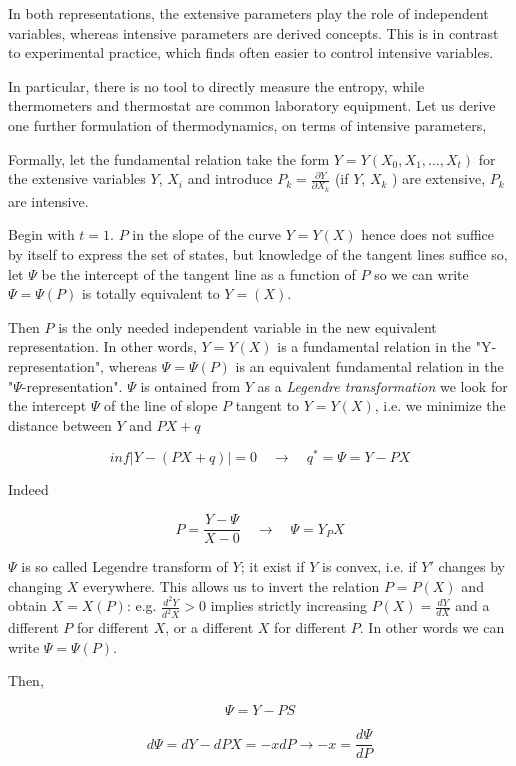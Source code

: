 \documentclass{article}
\begin{document}
In both representations, the extensive parameters play the role of independent variables, whereas intensive parameters are derived concepts. This is in contrast to experimental practice, which finds often easier to control intensive variables.

In particular, there is no tool to directly measure the entropy, while thermometers and thermostat are common laboratory equipment. Let us derive one further formulation of thermodynamics, on terms of intensive parameters,

Formally, let the fundamental relation take the form $Y=Y(X_0,X_1,...,X_t)$ for the extensive variables $Y$, $X_i$ and introduce $P_k = \frac {\partial Y}{\partial X_k}$ (if $Y$, $X_k$ ) are extensive, $P_k$ are intensive.

Begin with $t=1$. $P$ in the slope of the curve $Y=Y(X)$ hence does not suffice by itself to express the set of states, but knowledge of the tangent lines suffice so, let $\Psi$ be the intercept of the tangent line as a function of $P$ so we can write $\Psi = \Psi(P)$ is totally equivalent to $Y=(X)$.

Then $P$ is the only needed independent variable in the new equivalent representation. In other words, $Y=Y(X)$ is a fundamental relation in the "Y-representation", whereas $\Psi = \Psi(P)$ is an equivalent fundamental relation in the "$\Psi$-representation". $\Psi$ is ontained from $Y$ as a \emph{Legendre transformation} we look for the intercept $\Psi$ of the line of slope $P$ tangent to $Y=Y(X)$, i.e. we minimize the distance between $Y$ and $PX+q$

\begin{equation}
inf|Y-(PX+q)|=0 \quad \rightarrow \quad q^* = \Psi = Y - PX
\end{equation}

Indeed

$$P = \frac{Y-\Psi}{X-0} \quad \rightarrow \quad \Psi = Y _ PX $$

$\Psi$ is so called Legendre transform of $Y$; it exist if $Y$ is convex, i.e. if $Y'$ changes by changing $X$ everywhere. This allows us to invert the relation $P=P(X)$ and obtain $X=X(P)$: e.g. $\frac{d^2 Y}{d^2 X} > 0$ implies strictly increasing $P(X) = \frac{d Y}{d X}$ and a different $P$ for different $X$, or a different $X$ for different $P$. In other words we can write $\Psi = \Psi(P)$.

Then, 

$$\Psi = Y - PS $$

$$ d \Psi = d Y - d P X = - x d P  \rightarrow -x = \frac{d \Psi}{ d P}$$
\end{document}
